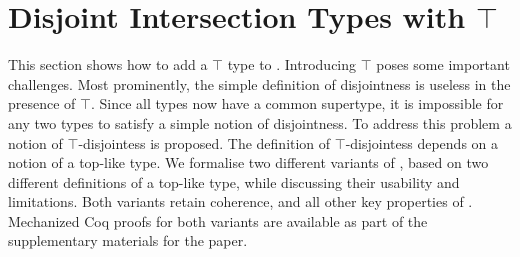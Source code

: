 \section{Disjoint Intersection Types with $\top$}

This section shows how to add a $\top$ type to \name.
Introducing $\top$ poses some important challenges. Most prominently,
the simple definition of disjointness is useless in the presence of
$\top$. Since all types now have a common supertype, it is impossible
for any two types to satisfy a simple notion of disjointness. To
address this problem a notion of $\top$-disjointess is proposed.  The
definition of $\top$-disjointess depends on a notion of a top-like
type. We formalise two different variants of \name, based on two different
definitions of a top-like type, while discussing their usability and
limitations. Both variants retain coherence, and all other key
properties of \name. 
Mechanized Coq proofs for both variants are available as part of the 
supplementary materials for the paper.



